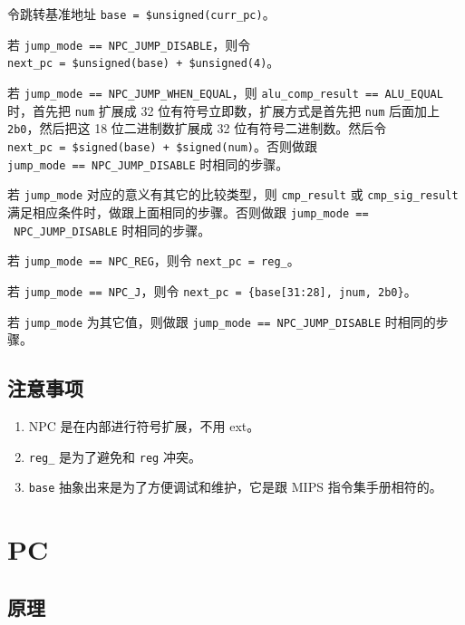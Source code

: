 \documentclass[12pt,AutoFakeBold,AutoFakeSlant]{article}
\providecommand{\tightlist}{%
  \setlength{\itemsep}{0pt}\setlength{\parskip}{0pt}}
\begin{document}
令跳转基准地址 \texttt{base\ =\ \$unsigned(curr\_pc)}。

若 \texttt{jump\_mode\ ==\ NPC\_JUMP\_DISABLE}，则令
\texttt{next\_pc\ =\ \$unsigned(base)\ +\ \$unsigned(4)}。

若 \texttt{jump\_mode\ ==\ NPC\_JUMP\_WHEN\_EQUAL}，则
\texttt{alu\_comp\_result\ ==\ ALU\_EQUAL} 时，首先把 \texttt{num}
扩展成 32 位有符号立即数，扩展方式是首先把 \texttt{num} 后面加上
\texttt{2\textquotesingle{}b0}，然后把这 18 位二进制数扩展成 32
位有符号二进制数。然后令
\texttt{next\_pc\ =\ \$signed(base)\ +\ \$signed(num)}。否则做跟
\texttt{jump\_mode\ ==\ NPC\_JUMP\_DISABLE} 时相同的步骤。

若 \texttt{jump\_mode} 对应的意义有其它的比较类型，则 \texttt{cmp\_result}
或 \texttt{cmp\_sig\_result}
满足相应条件时，做跟上面相同的步骤。否则做跟
\texttt{jump\_mode\ ==\\\ NPC\_JUMP\_DISABLE} 时相同的步骤。

若 \texttt{jump\_mode\ ==\ NPC\_REG}，则令 \texttt{next\_pc\ =\ reg\_}。

若 \texttt{jump\_mode\ ==\ NPC\_J}，则令
\texttt{next\_pc\ =\ \{base{[}31:28{]},\ jnum,\ 2\textquotesingle{}b0\}}。

若 \texttt{jump\_mode} 为其它值，则做跟
\texttt{jump\_mode\ ==\ NPC\_JUMP\_DISABLE} 时相同的步骤。

\hypertarget{ux6ce8ux610fux4e8bux9879}{%
\subsection{注意事项}\label{ux6ce8ux610fux4e8bux9879}}

\begin{enumerate}
\def\labelenumi{\arabic{enumi}.}
\tightlist
\item
  NPC 是在内部进行符号扩展，不用 ext。
\item
  \texttt{reg\_} 是为了避免和 \texttt{reg} 冲突。
\item
  \texttt{base} 抽象出来是为了方便调试和维护，它是跟 MIPS
  指令集手册相符的。
\end{enumerate}

\hypertarget{pc}{%
\section{PC}\label{pc}}

\hypertarget{ux539fux7406-1}{%
\subsection{原理}\label{ux539fux7406-1}}
\end{document}
